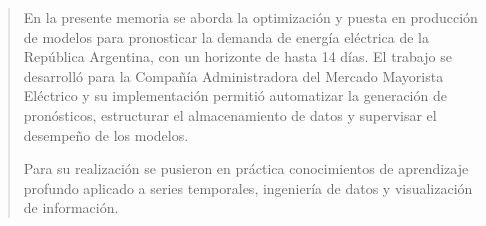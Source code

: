 \documentclass[
    11pt,
    spanish,
    singlespacing,
    parskip,
    headsepline,
    bookmarks=true,
    unicode=true,
    pdftoolbar=true,
    pdfmenubar=true,
    pdffitwindow=false,
    colorlinks=true,
    linkcolor=blue,
    citecolor=blue,
    urlcolor=blue
]{MastersDoctoralThesis}
\def\textbf#1{#1}%
\begin{document}



\frontmatter %
\pagestyle{plain} %


\begin{abstract}
\addchaptertocentry{\abstractname} %
En la presente memoria se aborda la optimización y puesta en producción de modelos para pronosticar la demanda de energía eléctrica de la República Argentina, con un horizonte de hasta 14 días. El trabajo se desarrolló para la Compañía Administradora del Mercado Mayorista Eléctrico y su implementación permitió automatizar la generación de pronósticos, estructurar el almacenamiento de datos y supervisar el desempeño de los modelos.

Para su realización se pusieron en práctica conocimientos de aprendizaje profundo aplicado a series temporales, ingeniería de datos y visualización de información.
\end{abstract}




\tableofcontents
\listoffigures
\listoftables

\end{document}
